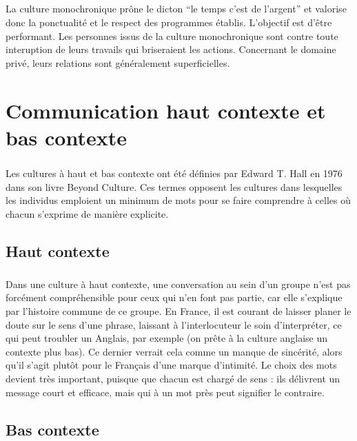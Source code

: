 \paragraph{} 
La culture monochronique prône le dicton ``le temps c'est de l'argent'' et valorise donc la ponctualité et le respect des programmes établis. L'objectif est d'être performant. Les personnes issus de la culture monochronique sont contre toute interuption de leurs travails qui briseraient les actions. Concernant le domaine privé, leurs relations sont généralement superficielles.

\chapter{Communication haut contexte et bas contexte}
\paragraph{}
Les cultures à haut et bas contexte ont été définies par Edward T. Hall en 1976 dans son livre Beyond Culture. Ces termes opposent les cultures dans lesquelles les individus emploient un minimum de mots pour se faire comprendre à celles où chacun s’exprime de manière explicite.
\section{Haut contexte}
\paragraph{}
Dans une culture à haut contexte, une conversation au sein d’un groupe n’est pas forcément compréhensible pour ceux qui n’en font pas partie, car elle s’explique par l’histoire commune de ce groupe. En France, il est courant de laisser planer le doute sur le sens d’une phrase, laissant à l’interlocuteur le soin d’interpréter, ce qui peut troubler un Anglais, par exemple (on prête à la culture anglaise un contexte plus bas). Ce dernier verrait cela comme un manque de sincérité, alors qu’il s’agit plutôt pour le Français d’une marque d’intimité. Le choix des mots devient très important, puisque que chacun est chargé de sens : ils délivrent un message court et efficace, mais qui à un mot près peut signifier le contraire.

\section{Bas contexte}
